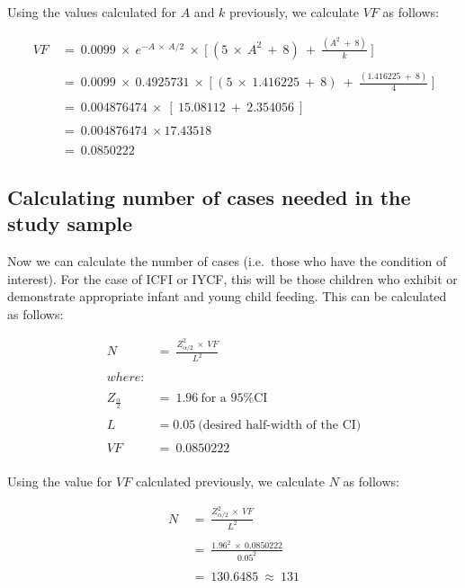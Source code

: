 \documentclass[12pt,a4paper]{article}
\theoremstyle{definition}
\theoremstyle{definition}
\theoremstyle{definition}
\theoremstyle{remark}
\begin{document}
Using the values calculated for \(A\) and \(k\) previously, we calculate
\(VF\) as follows:

\[ \begin{aligned}
VF ~ & = ~ 0.0099 ~ \times ~ e ^ {-A ~ \times ~ A/2} ~ \times ~ \Bigg [ ~ (5 ~ \times ~ A ^ 2 ~ + ~ 8) ~ + ~ \frac{(A ^ 2 ~ + ~ 8)}{k} ~ \Bigg ] \\
\\
& = ~ 0.0099 ~ \times ~ 0.4925731 ~ \times ~ \Bigg [ ~ (5 ~ \times ~ 1.416225 ~ + ~ 8) ~ + ~ \frac{(1.416225 ~ + ~ 8)}{4} ~ \Bigg ] \\
\\
& = ~ 0.004876474 ~ \times ~ [ ~ 15.08112 ~ + ~ 2.354056 ~] \\
\\
& = ~ 0.004876474 ~ \times 17.43518 \\
\\
& = ~ 0.0850222
\end{aligned} \]

\hypertarget{calculating-number-of-cases-needed-in-the-study-sample}{%
\subsection{Calculating number of cases needed in the study
sample}\label{calculating-number-of-cases-needed-in-the-study-sample}}

Now we can calculate the number of cases (i.e.~those who have the
condition of interest). For the case of ICFI or IYCF, this will be those
children who exhibit or demonstrate appropriate infant and young child
feeding. This can be calculated as follows:

\[ \begin{aligned}
N ~ & = ~ \frac{Z_{\alpha/2} ^ 2 ~ \times ~ VF}{L ^ 2} \\
\\
where: & \\
\\
Z_{\frac{\alpha}{2}} ~ & = ~ 1.96 ~ \text{for a 95\% CI} \\
\\
L ~ & = 0.05 ~ \text{(desired half-width of the CI)} \\
\\
VF ~ & = ~ 0.0850222  \\
\end{aligned} \]

Using the value for \(VF\) calculated previously, we calculate \(N\) as
follows:

\[ \begin{aligned}
N ~ & = ~ \frac{Z_{\alpha/2} ^ 2 ~ \times ~ VF}{L ^ 2} \\
\\
& = ~ \frac{1.96 ^ 2 ~ \times ~ 0.0850222}{0.05^ 2} \\
\\
& = ~ 130.6485 ~ \approx ~ 131
\end{aligned} \]
\end{document}
